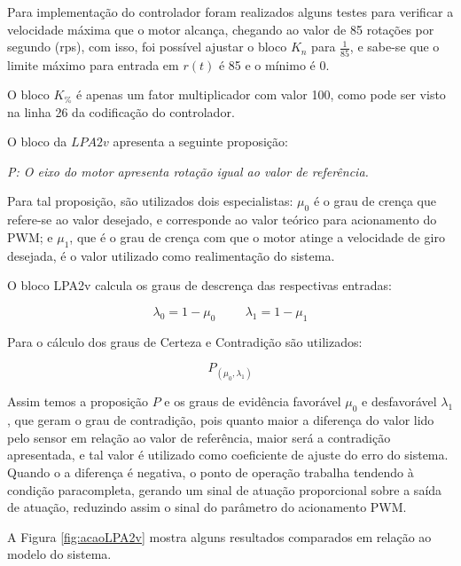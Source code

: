  



Para implementação do controlador foram realizados alguns testes 
para verificar a velocidade máxima que o motor alcança, 
chegando ao valor de 85 rotações por segundo (rps), com isso, 
foi possível ajustar o bloco $K_n$ para $\frac{1}{85}$, 
e sabe-se que o limite máximo para entrada em $r(t)$ é 85 e o mínimo é 0.

O bloco $K_\%$ é apenas um fator multiplicador com valor 100, 
como pode ser visto na linha 26 da codificação do controlador.

O bloco da $LPA2v$ apresenta a seguinte proposição:

\emph{ P: O eixo do motor apresenta rotação igual ao valor de referência.}

Para tal proposição, 
são utilizados dois especialistas: 
$\mu _0$ é o grau de crença que refere-se ao valor desejado, 
e corresponde ao valor teórico para acionamento do PWM;
e $\mu _1$, que é o grau de crença com que o motor 
atinge a velocidade de giro desejada, 
é o valor utilizado como realimentação do sistema.

O bloco LPA2v calcula os graus de descrença das respectivas entradas:

\begin{equation}
\lambda _0 = 1- \mu _0   \hspace{1cm}   \lambda _1 = 1 - \mu_1 
\end{equation}

Para o cálculo dos graus de Certeza e Contradição são utilizados:

\begin{equation}
P _{(\mu_0, \lambda_1)}
\end{equation}

Assim temos a proposição $P$ e os graus de evidência favorável $\mu _0$ e 
desfavorável $\lambda _1$, que geram o grau de contradição, pois 
quanto maior a diferença do valor lido pelo sensor em relação
ao valor de referência, 
maior será a contradição apresentada, 
e tal valor é utilizado como coeficiente de ajuste do erro do sistema.
Quando o a diferença é negativa, 
o ponto de operação trabalha tendendo à condição paracompleta,
gerando um sinal de atuação proporcional sobre a saída de atuação, 
reduzindo assim o sinal do parâmetro do acionamento PWM.

A Figura \ref{fig:acaoLPA2v} mostra alguns resultados comparados em 
relação ao modelo do sistema.

